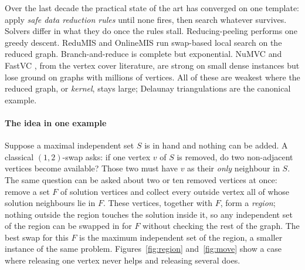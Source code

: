 \documentclass[review,authoryear,11pt]{elsarticle}
\theoremstyle{definition}
\begin{document}
Over the last decade the practical state of the art has converged on one
template: apply \emph{safe data reduction rules} until none fires, then search
whatever survives. Solvers differ in what they do once the rules stall.
Reducing-peeling \citep{chang2017} performs one greedy descent. ReduMIS
\citep{lamm2017} and OnlineMIS \citep{dahlum2016} run swap-based local search on
the reduced graph. Branch-and-reduce \citep{akiba2016} is complete but
exponential. NuMVC \citep{cai2013numvc} and FastVC \citep{cai2017fastvc}, from the
vertex cover literature, are strong on small dense instances but lose ground on
graphs with millions of vertices. All of these are weakest where the reduced
graph, or \emph{kernel}, stays large; Delaunay triangulations are the canonical
example.

\paragraph{The idea in one example} Suppose a maximal independent set $S$ is in
hand and nothing can be added. A classical $(1,2)$-swap asks: if one vertex $v$ of
$S$ is removed, do two non-adjacent vertices become available? Those two must have
$v$ as their \emph{only} neighbour in $S$. The same question can be asked about
two or ten removed vertices at once: remove a set $F$ of solution vertices and
collect every outside vertex all of whose solution neighbours lie in $F$. These
vertices, together with $F$, form a \emph{region}; nothing outside the region
touches the solution inside it, so any independent set of the region can be swapped
in for $F$ without checking the rest of the graph. The best swap for this $F$ is
the maximum independent set of the region, a smaller instance of the same problem.
Figures~\ref{fig:region} and~\ref{fig:move} show a case where releasing one vertex
never helps and releasing several does.
\end{document}
